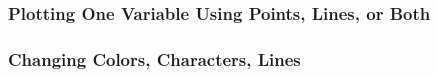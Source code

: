 \documentclass[10pt]{beamer}
\begin{document}
\begin{frame}[fragile]
\frametitle{Plotting One Variable Using Points, Lines, or Both}
\label{figTP2}
\vspace*{-2ex}
\begin{center}
\end{center}
\end{frame}


\begin{frame}[fragile]
\frametitle{Changing Colors, Characters, Lines}
\label{figTP3}
\vspace*{-2ex}
\begin{center}
\end{center}
\end{frame}
\end{document}
